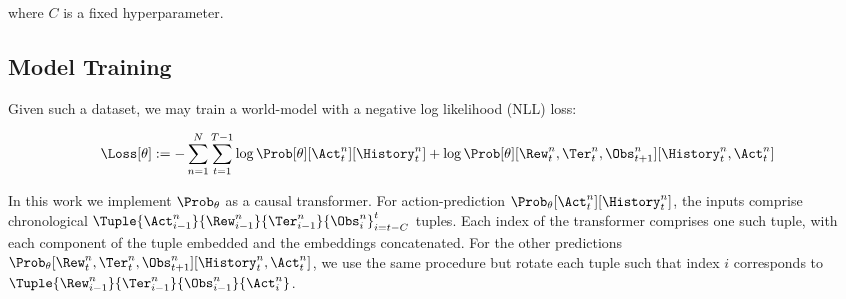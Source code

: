 where $C$ is a fixed hyperparameter.

\subsection{Model Training}
Given such a dataset, we may train a
world-model with a negative log likelihood (NLL) loss:

\begin{align}
    \Loss[\theta] :=
    -\sum_{n=1}^N\sum_{t=1}^{T-1}
    \log \Prob[\theta]
    [ \Act^n_t ]
    [ \History^n_t ] +  \log \Prob[\theta]
    [ \Rew^n_t, \Ter^n_t, \Obs^n_{t+1} ]
    [ \History^n_t, \Act^n_t ]
\end{align}

In this work we implement $\Prob_\theta$ as a causal transformer. For
action-prediction $\Prob_\theta [ \Act^n_t ] [ \History^n_t ]$, the inputs
comprise chronological
$\Tuple{\Act^n_{i-1}}{\Rew^n_{i-1}}{\Ter^n_{i-1}}{\Obs^n_i}_{i=t-C}^t$ tuples.
Each index of the transformer comprises one such tuple, with each component of
the tuple embedded and the embeddings concatenated. For the other predictions
$\Prob_\theta [ \Rew^n_t, \Ter^n_t, \Obs^n_{t+1} ] [ \History^n_t, \Act^n_t ]$,
we use the same procedure but rotate each tuple such that index $i$ corresponds
to $\Tuple{\Rew^n_{i-1}}{\Ter^n_{i-1}}{\Obs^n_{i-1}}{\Act^n_{i}}$.


